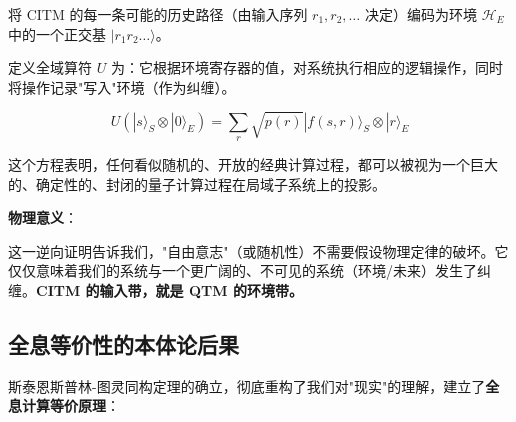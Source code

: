 将 CITM 的每一条可能的历史路径（由输入序列 $r_1, r_2, \dots$ 决定）编码为环境 $\mathcal{H}_E$ 中的一个正交基 $|r_1 r_2 \dots\rangle$。

定义全域算符 $U$ 为：它根据环境寄存器的值，对系统执行相应的逻辑操作，同时将操作记录"写入"环境（作为纠缠）。

\begin{equation}
U (|s\rangle_S \otimes |0\rangle_E) = \sum_r \sqrt{p(r)} |f(s,r)\rangle_S \otimes |r\rangle_E
\end{equation}

这个方程表明，任何看似随机的、开放的经典计算过程，都可以被视为一个巨大的、确定性的、封闭的量子计算过程在局域子系统上的投影。

\textbf{物理意义}：

这一逆向证明告诉我们，"自由意志"（或随机性）不需要假设物理定律的破坏。它仅仅意味着我们的系统与一个更广阔的、不可见的系统（环境/未来）发生了纠缠。\textbf{CITM 的输入带，就是 QTM 的环境带。}

\subsection{全息等价性的本体论后果}

斯泰恩斯普林-图灵同构定理的确立，彻底重构了我们对"现实"的理解，建立了\textbf{全息计算等价原理}：

